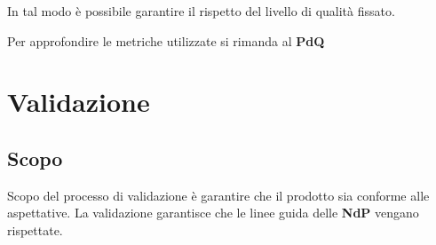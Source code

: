 In tal modo è possibile garantire il rispetto del livello
di qualità fissato.

Per approfondire le metriche utilizzate si rimanda al \textbf{PdQ}



\section{Validazione}\label{s:validazione}

\subsection{Scopo} Scopo del processo di validazione è garantire che il prodotto sia conforme alle aspettative. La validazione garantisce che le linee guida delle \textbf{NdP} vengano rispettate.
